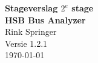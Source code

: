 \documentclass[a4paper,oneside,11pt]{article}
\begin{document}
\topmargin=0.0cm
\headheight=0.0cm
\setlength{\voffset}{0.0in}
\setlength{\oddsidemargin}{2.15cm}
\setlength{\evensidemargin}{0.0in}
\setlength{\textwidth}{\paperwidth}

\begin{titlepage}
\vspace*{\fill}
\begin{center}

{ \Large \textbf{Stageverslag \boldmath $2^e$ stage} } \\
{ \Large \textbf{HSB Bus Analyzer} } \\
$ $ \\
Rink Springer \\
$ $ \\
Versie 1.2.1 \\
\today \\
\end{center}
\vspace*{1.0cm}
\end{titlepage}
\end{document}
